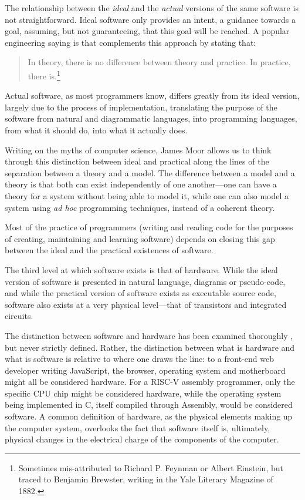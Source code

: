 The relationship between the \emph{ideal} and the \emph{actual} versions of the same software is not straightforward. Ideal software only provides an intent, a guidance towards a goal, assuming, but not guaranteeing, that this goal will be reached. A popular engineering saying is that complements this approach by stating that:

\begin{quote}
    In theory, there is no difference between theory and practice. In practice, there is.\footnote{Sometimes mis-attributed to Richard P. Feynman or Albert Einstein, but traced to Benjamin Brewster, writing in the Yale Literary Magazine of 1882.}
\end{quote}

Actual software, as most programmers know, differs greatly from its ideal version, largely due to the process of implementation, translating the purpose of the software from natural and diagrammatic languages, into programming languages, from what it should do, into what it actually does.

Writing on the myths of computer science, James Moor \citep{moor_three_1978} allows us to think through this distinction between ideal and practical along the lines of the separation between a theory and a model. The difference between a model and a theory is that both can exist independently of one another—one can have a theory for a system without being able to model it, while one can also model a system using \emph{ad hoc} programming techniques, instead of a coherent theory.

Most of the practice of programmers (writing and reading code for the purposes of creating, maintaining and learning software) depends on closing this gap between the ideal and the practical existences of software.

The third level at which software exists is that of hardware. While the ideal version of software is presented in natural language, diagrams or pseudo-code, and while the practical version of software exists as executable source code, software also exists at a very physical level—that of transistors and integrated circuits.

The distinction between software and hardware has been examined thoroughly \citep{kittler_there_1997,chun_sourcery_2008,rapaport_philosophy_2005}, but never strictly defined. Rather, the distinction between what is hardware and what is software is relative to where one draws the line: to a front-end web developer writing JavaScript, the browser, operating system and motherboard might all be considered hardware. For a RISC-V assembly programmer, only the specific CPU chip might be considered hardware, while the operating system being implemented in C, itself compiled through Assembly, would be considered software. A common definition of hardware, as the physical elements making up the computer system, overlooks the fact that software itself is, ultimately, physical changes in the electrical charge of the components of the computer.

